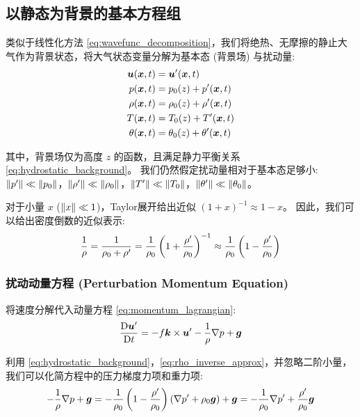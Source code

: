 \subsection{以静态为背景的基本方程组}

类似于线性化方法 \eqref{eq:wavefunc_decomposition}，我们将绝热、无摩擦的静止大气作为背景状态，将大气状态变量分解为基本态 (背景场) 与扰动量:
\begin{align*}
    \bm{u}(\bm{x}, t) &= \bm{u}^\prime(\bm{x}, t) \\
    p(\bm{x}, t) &= p_0(z) + p^\prime(\bm{x}, t) \\
    \rho(\bm{x}, t) &= \rho_0(z) + \rho^\prime(\bm{x}, t) \\
    T(\bm{x}, t) &= T_0(z) + T^\prime(\bm{x}, t) \\
    \theta(\bm{x}, t) &= \theta_0(z) + \theta^\prime(\bm{x}, t)
\end{align*}

其中，背景场仅为高度 $z$ 的函数，且满足静力平衡关系 \eqref{eq:hydrostatic_background}。
我们仍然假定扰动量相对于基本态足够小: $\lVert p^\prime \rVert \ll \lVert p_0 \rVert$，$\lVert \rho^\prime \rVert \ll \lVert \rho_0 \rVert$，$\lVert T^\prime \rVert \ll \lVert T_0 \rVert$，$\lVert \theta^\prime \rVert \ll \lVert \theta_0 \rVert$。

对于小量 $x$ ($\lVert x \rVert \ll 1$)，Taylor展开给出近似 $(1 + x)^{-1} \approx 1 - x$。
因此，我们可以给出密度倒数的近似表示:
\begin{equation}
    \frac{1}{\rho} = \frac{1}{\rho_0 + \rho^\prime} = \frac{1}{\rho_0} \left(1 + \frac{\rho^\prime}{\rho_0}\right)^{-1} \approx \frac{1}{\rho_0} \left(1 - \frac{\rho^\prime}{\rho_0}\right)
    \label{eq:rho_inverse_approx}
\end{equation}

\subsubsection{扰动动量方程 (Perturbation Momentum Equation)}

将速度分解代入动量方程 \eqref{eq:momentum_lagrangian}:
\begin{equation*}
    \frac{\mathrm{D} \bm{u}^\prime}{\mathrm{D} t} = -f \bm{k} \times \bm{u}^\prime - \frac{1}{\rho} \nabla p + \bm{g}
\end{equation*}

利用 \eqref{eq:hydrostatic_background}，\eqref{eq:rho_inverse_approx}，并忽略二阶小量，我们可以化简方程中的压力梯度力项和重力项:
\begin{equation*}
    -\frac{1}{\rho} \nabla p + \bm{g} = -\frac{1}{\rho_0} \left(1 - \frac{\rho^\prime}{\rho_0}\right) (\nabla p^\prime + \rho_0 \bm{g}) + \bm{g} = - \frac{1}{\rho_0} \nabla p^\prime + \frac{\rho^\prime}{\rho_0} \bm{g}
\end{equation*}

